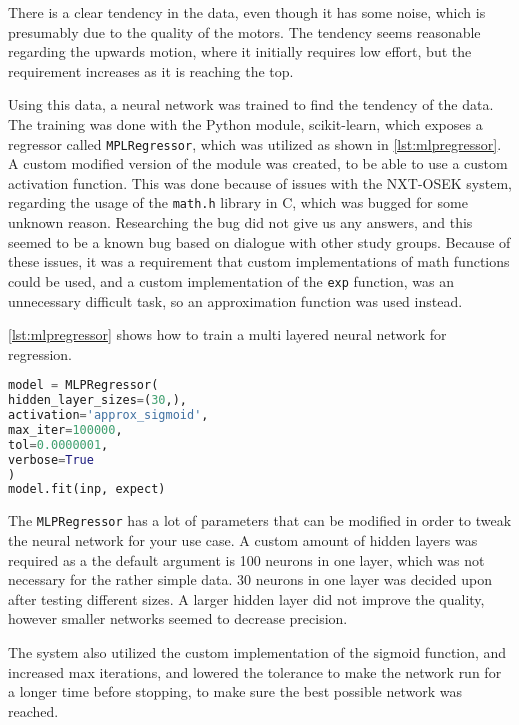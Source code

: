
There is a clear tendency in the data, even though it has some noise, which is presumably due to the quality of the motors.
The tendency seems reasonable regarding the upwards motion, where it initially requires low effort, but the requirement increases as it is reaching the top.

Using this data, a neural network was trained to find the tendency of the data.
The training was done with the Python module, scikit-learn\cite{scikit-learn}, which exposes a regressor called \texttt{MPLRegressor}, which was utilized as shown in \autoref{lst:mlpregressor}.
A custom modified version of the module was created, to be able to use a custom activation function.
This was done because of issues with the NXT-OSEK system, regarding the usage of the \texttt{math.h} library in C, which was bugged for some unknown reason.
Researching the bug did not give us any answers, and this seemed to be a known bug based on dialogue with other study groups.
Because of these issues, it was a requirement that custom implementations of math functions could be used, and a custom implementation of the \texttt{exp} function, was an unnecessary difficult task, so an approximation function was used instead.

\autoref{lst:mlpregressor} shows how to train a multi layered neural network for regression.

\begin{lstlisting}[language=python,label={lst:mlpregressor},caption={Training a MLPRegressor with scikit}]
model = MLPRegressor(
hidden_layer_sizes=(30,),
activation='approx_sigmoid',
max_iter=100000,
tol=0.0000001,
verbose=True
)
model.fit(inp, expect)

\end{lstlisting}

The \texttt{MLPRegressor} has a lot of parameters that can be modified in order to tweak the neural network for your use case.
A custom amount of hidden layers was required as a the default argument is 100 neurons in one layer, which was not necessary for the rather simple data.
30 neurons in one layer was decided upon after testing different sizes.
A larger hidden layer did not improve the quality, however smaller networks seemed to decrease precision.

The system also utilized the custom implementation of the sigmoid function, and increased max iterations, and lowered the tolerance to make the network run for a longer time before stopping, to make sure the best possible network was reached.

